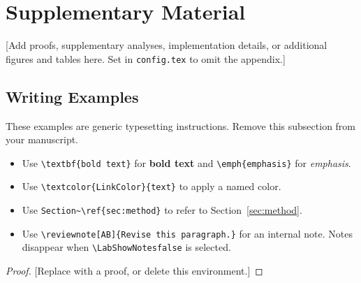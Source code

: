 \section{Supplementary Material}\label{app:supplement}
[Add proofs, supplementary analyses, implementation details, or additional
figures and tables here. Set \texttt{\string\LabShowAppendixfalse} in
\texttt{config.tex} to omit the appendix.]

\subsection{Writing Examples}
These examples are generic typesetting instructions. Remove this subsection
from your manuscript.
\begin{itemize}
  \item Use \verb|\textbf{bold text}| for \textbf{bold text} and
        \verb|\emph{emphasis}| for \emph{emphasis}.
  \item Use \verb|\textcolor{LinkColor}{text}| to apply a named color.
  \item Use \verb|Section~\ref{sec:method}| to refer to Section~\ref{sec:method}.
  \item Use \verb|\reviewnote[AB]{Revise this paragraph.}| for an internal note.
        Notes disappear when \verb|\LabShowNotesfalse| is selected.
\end{itemize}

\begin{definition}
\end{definition}

\begin{theorem}
\end{theorem}
\begin{proof}
{[Replace with a proof, or delete this environment.]}
\end{proof}
